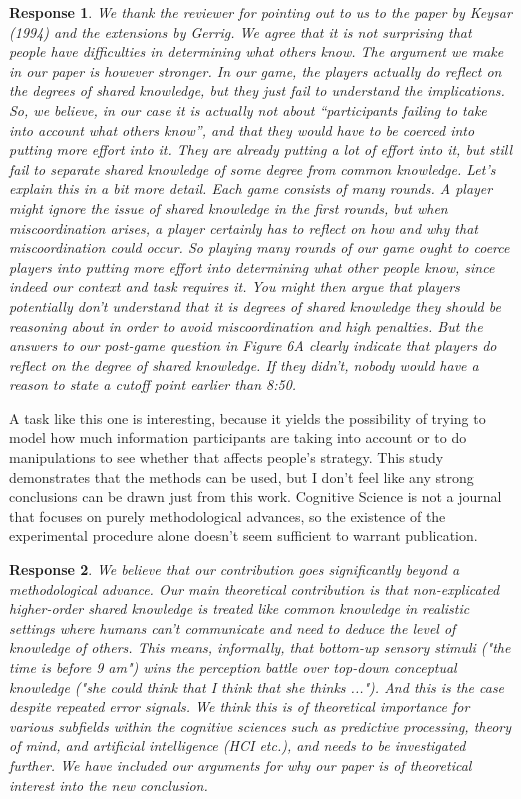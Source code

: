 \documentclass[a4paper]{article}
\newtheorem{response}{Response}
\begin{document}
\begin{response}
We thank the reviewer for pointing out to us to the paper by Keysar (1994) and the extensions by Gerrig. We agree that it is not surprising that people have difficulties in determining what others know. The argument we make in our paper is however stronger. In our game, the players actually \emph{do} reflect on the degrees of shared knowledge, but they just fail to understand the implications. So, we believe, in our case it is actually not about ``participants failing to take into account what others know'', and that they would have to be coerced into putting more effort into it. They are already putting a lot of effort into it, but still fail to separate shared knowledge of some degree from common knowledge. Let's explain this in a bit more detail. Each game consists of many rounds. A player might ignore the issue of shared knowledge in the first rounds, but when miscoordination arises, a player certainly has to reflect on how and why that miscoordination could occur. So playing many rounds of our game ought to coerce players into putting more effort into determining what other people know, since indeed our context and task requires it. You might then argue that players potentially don't understand that it is degrees of shared knowledge they should be reasoning about in order to avoid miscoordination and high penalties. But the answers to our post-game question in Figure 6A clearly indicate that players \emph{do} reflect on the degree of shared knowledge. If they didn't, nobody would have a reason to state a cutoff point earlier than 8:50.
\end{response}

A task like this one is interesting, because it yields the possibility of trying to model how much information participants are taking into account or to do manipulations to see whether that affects people's strategy. This study demonstrates that the methods can be used, but I don't feel like any strong conclusions can be drawn just from this work. Cognitive Science is not a journal that focuses on purely methodological advances, so the existence of the experimental procedure alone doesn't seem sufficient to warrant publication.

\begin{response}
We believe that our contribution goes significantly beyond a methodological advance. Our main theoretical contribution is that non-explicated higher-order shared knowledge is treated like common knowledge in realistic settings where humans can't communicate and need to \emph{deduce} the level of knowledge of others. This means, informally, that bottom-up sensory stimuli ("the time is before 9 am") \emph{wins the perception battle} over top-down conceptual knowledge ("she could think that I think that she thinks ..."). And this is the case despite repeated error signals. We think this is of theoretical importance for various subfields within the cognitive sciences such as predictive processing, theory of mind, and artificial intelligence (HCI etc.), and needs to be investigated further. We have included our arguments for why our paper is of theoretical interest into the new conclusion.
\end{response}
\end{document}
